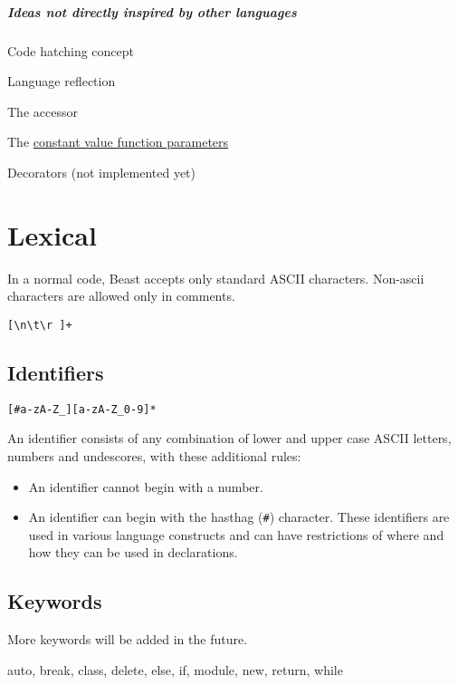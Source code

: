 \paragraph{Ideas not directly inspired by other languages}
\begin{compactitem}
	\item Code hatching concept
	\item Language reflection
	\item The \hyperref[colonAccessor]{\kwd{:}} accessor
	\item The \hyperref[constantValueParameter]{constant value function parameters}	
	\item Decorators (not implemented yet)
\end{compactitem}

\chapter{Lexical}
In a normal code, Beast accepts only standard ASCII characters. Non-ascii characters are allowed only in comments.

\begin{grammar}
	 \verb|[\n\t\r ]+|
\end{grammar}

\section{Identifiers}
\begin{grammar}
	 \verb|[#a-zA-Z_][a-zA-Z_0-9]*|
\end{grammar}
An identifier consists of any combination of lower and upper case ASCII letters, numbers and undescores, with these additional rules:
\begin{itemize}
	\item An identifier cannot begin with a number.
	\item An identifier can begin with the hasthag (\verb|#|) character. These identifiers are used in various language constructs and can have restrictions of where and how they can be used in declarations.
\end{itemize}

\section{Keywords} \label{keywords}
More keywords will be added in the future.

\begin{code}
auto, break, class, delete, else, if, module, new, return, while
\end{code}

